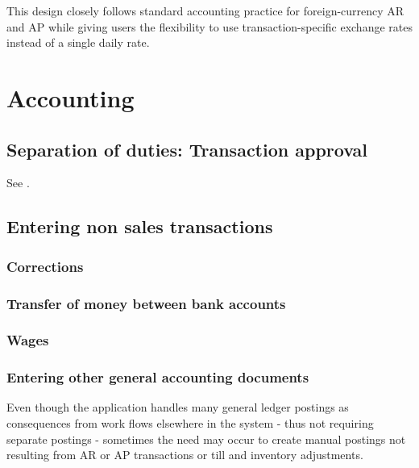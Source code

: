 This design closely follows standard accounting practice for foreign-currency AR and AP while giving users the flexibility to use transaction-specific exchange rates instead of a single daily rate.

\chapter{Accounting}
\label{cha-business-processes-accounting}

\section{Separation of duties: Transaction approval}
\label{sec-business-processes-accounting-transaction-approval}

See .

\section{Entering non sales transactions}
\label{sec-business-processes-accounting-transaction-entry}

\subsection{Corrections}
\label{subsec-business-processes-accounting-correction-transaction-entry}

\subsection{Transfer of money between bank accounts}
\label{subsec-business-processes-accounting-entry-bank-to-bank-transactions}

\subsection{Wages}
\label{subsec-business-processes-accounting-entry-of-wages}

\subsection{Entering other general accounting documents}
\label{subsec-business-processes-accounting-entry-others}

Even though the application handles many general ledger postings as consequences
from work flows elsewhere in the system - thus not requiring separate postings -
sometimes the need may occur to create manual postings not resulting from
AR or AP transactions or till and inventory adjustments.


